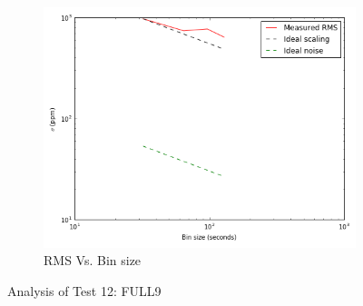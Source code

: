 \documentclass[conference]{IEEEtran}
\begin{document}
\begin{figure}[H]
    \begin{subfigure}{3}
        \includegraphics[scale=0.6]{rms_test12}
        \caption{RMS Vs. Bin size}
    \end{subfigure}
    \caption{Analysis of Test 12: FULL9}
\end{figure}
\end{document}
